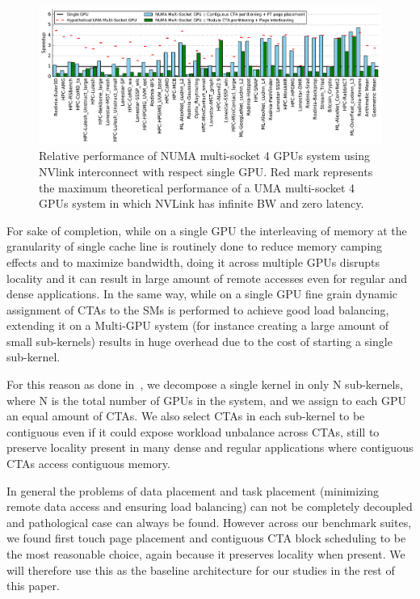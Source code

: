 \begin{figure}[tp]
    \centering
    \includegraphics[width=1.0\linewidth]{figures/plot_different_baselines.pdf}
    \caption{Relative performance of NUMA multi-socket 4 GPUs system using NVlink
	interconnect with respect single GPU. Red mark represents the maximum 
	theoretical performance of a UMA multi-socket 4 GPUs system in which NVLink 
	has infinite BW and zero latency.}
    \label{fig:motivation2}
\end{figure}

For sake of completion, while on a single GPU the interleaving of memory at 
the granularity of single cache line is routinely done to reduce memory 
camping effects and to maximize bandwidth, doing it across multiple GPUs 
disrupts locality and it can result in large amount of remote accesses even 
for regular and dense applications. In the same way, while on a single GPU 
fine grain dynamic assignment of CTAs to the SMs is performed to achieve good 
load balancing, extending it on a Multi-GPU system (for instance creating a 
large amount of small sub-kernels) results in huge overhead due to the cost 
of starting a single sub-kernel.

For this reason as done in~\cite{Cabezas2015}, we decompose a single kernel 
in only N sub-kernels, where N is the total number of GPUs in the system, and 
we assign to each GPU an equal amount of CTAs. We also select CTAs in each 
sub-kernel to be contiguous even if it could expose workload unbalance across 
CTAs, still to preserve locality present in many dense and regular applications 
where contiguous CTAs access contiguous memory. 

In general the problems of data placement and task placement (minimizing 
remote data access and ensuring load balancing) can not be completely 
decoupled and pathological case can always be found.
However across our benchmark suites, we found first touch page placement and 
contiguous CTA block scheduling to be the most reasonable choice, 
again because it preserves locality when present. We will therefore use this 
as the baseline architecture for our studies in the rest of this paper.

